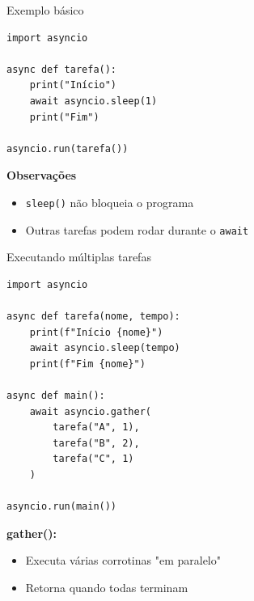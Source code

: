 \documentclass{beamer}
\begin{document}
\begin{frame}[fragile]{Exemplo básico}
    
    \begin{verbatim}
import asyncio

async def tarefa():
    print("Início")
    await asyncio.sleep(1)
    print("Fim")

asyncio.run(tarefa())
    \end{verbatim}
    
    \vspace{0.3cm}
    
    \textbf{Observações}
    
    \begin{itemize}
        \item \texttt{sleep()} não bloqueia o programa
        \item Outras tarefas podem rodar durante o \texttt{await}
    \end{itemize}
    
\end{frame}

\begin{frame}[fragile]{Executando múltiplas tarefas}
    
    \begin{verbatim}
import asyncio

async def tarefa(nome, tempo):
    print(f"Início {nome}")
    await asyncio.sleep(tempo)
    print(f"Fim {nome}")

async def main():
    await asyncio.gather(
        tarefa("A", 1),
        tarefa("B", 2),
        tarefa("C", 1)
    )

asyncio.run(main())
    \end{verbatim}
    
    \vspace{0.3cm}
    
    \textbf{gather():}
    \begin{itemize}
        \item Executa várias corrotinas "em paralelo"
        \item Retorna quando todas terminam
    \end{itemize}
    
\end{frame}
\end{document}
